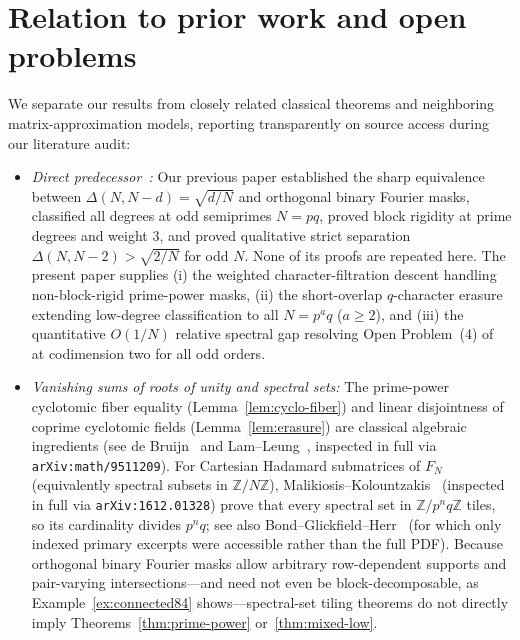 \documentclass[11pt,reqno]{amsart}
\numberwithin{equation}{section}
\theoremstyle{definition}
\theoremstyle{remark}
\newcommand{\Z}{\mathbb{Z}}
\begin{document}
\section{Relation to prior work and open problems}
\label{sec:prior}

We separate our results from closely related classical theorems and neighboring matrix-approximation models, reporting transparently on source access during our literature audit:
\begin{itemize}[leftmargin=1.5em]
\item \emph{Direct predecessor~\cite{KKKKK26}:} Our previous paper established the sharp equivalence between $\Delta(N,N-d)=\sqrt{d/N}$ and orthogonal binary Fourier masks, classified all degrees at odd semiprimes $N=pq$, proved block rigidity at prime degrees and weight $3$, and proved qualitative strict separation $\Delta(N,N-2)>\sqrt{2/N}$ for odd $N$. None of its proofs are repeated here. The present paper supplies (i) the weighted character-filtration descent handling non-block-rigid prime-power masks, (ii) the short-overlap $q$-character erasure extending low-degree classification to all $N=p^a q$ ($a\ge 2$), and (iii) the quantitative $O(1/N)$ relative spectral gap resolving Open Problem~(4) of~\cite{KKKKK26} at codimension two for all odd orders.
\item \emph{Vanishing sums of roots of unity and spectral sets:} The prime-power cyclotomic fiber equality (Lemma~\ref{lem:cyclo-fiber}) and linear disjointness of coprime cyclotomic fields (Lemma~\ref{lem:erasure}) are classical algebraic ingredients (see de Bruijn~\cite{deB53} and Lam--Leung~\cite[Theorems~3.1 and~3.3, Corollary~3.4]{LL00}, inspected in full via \texttt{arXiv:math/9511209}). For Cartesian Hadamard submatrices of $F_N$ (equivalently spectral subsets in $\Z/N\Z$), Malikiosis--Kolountzakis~\cite[Theorems~1.2 and~2.1]{MK17} (inspected in full via \texttt{arXiv:1612.01328}) prove that every spectral set in $\Z/p^n q\Z$ tiles, so its cardinality divides $p^n q$; see also Bond--Glickfield--Herr~\cite{BGH19} (for which only indexed primary excerpts were accessible rather than the full PDF). Because orthogonal binary Fourier masks allow arbitrary row-dependent supports and pair-varying intersections---and need not even be block-decomposable, as Example~\ref{ex:connected84} shows---spectral-set tiling theorems do not directly imply Theorems~\ref{thm:prime-power} or~\ref{thm:mixed-low}.

\end{itemize}
\end{document}
